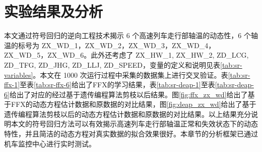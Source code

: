 \section{实验结果及分析}
\label{sec:sr-experiment}

本文通过符号回归的逆向工程技术揭示 6 个高速列车走行部轴温的动态性，6 个轴温的标号为 ZX\_WD\_1，ZX\_WD\_2，ZX\_WD\_3，ZX\_WD\_4，ZX\_WD\_5，ZX\_WD\_6。此外还考虑了 ZX\_HW\_1, ZX\_HW\_2, ZD\_LCG, ZD\_TFG, ZD\_JHG, ZD\_LLJ, ZD\_SPEED，变量的定义和说明见表\ref{tab:sr-variables}。本文在 1000 次运行过程中采集的数据集上进行交叉验证。表\ref{tab:sr-ffx-1}至表\ref{tab:sr-ffx-6}给出了FFX的学习结果，表\ref{tab:sr-deap-1}至表\ref{tab:sr-deap-6}给出了对应的经过基于遗传编程算法剪枝以后结果。图\ref{fig:ffx_zx_wd}给出了基于FFX的动态方程估计数据和原数据的对比结果，图\ref{fig:deap_zx_wd}给出了基于遗传编程算法剪枝以后的动态方程估计数据和原数据的对比结果。以上结果充分说明本文的符号回归方法可以有效揭示高速列车走行部轴温正常和失效状态下的动态特性，并且简洁的动态方程对真实数据的拟合效果很好。本章节的分析框架已通过机车监控中心进行实时测试。

